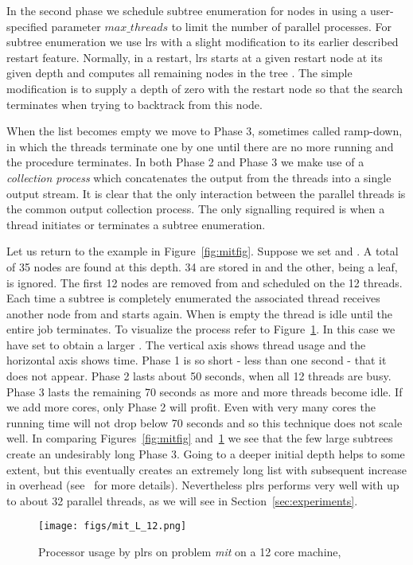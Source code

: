 \documentclass[a4paper,11pt]{article}   \usepackage{authblk} \usepackage[top=1.9cm,bottom=1.9cm,left=1.9cm,right=1.9cm]{geometry}
\newcommand{\progname}{\textsf}
\newcommand{\lrs}{\progname{lrs}\xspace}
\newcommand{\plrs}{\progname{plrs}\xspace}
\newcommand{\polytope}{\emph}
\newcommand{\mitine}{\polytope{mit}\xspace}
\newcommand{\maxthreads}{\ensuremath{\mathit{max\_threads}}\xspace}
\begin{document}
In the second phase we schedule subtree enumeration for nodes in 
using a user-specified parameter \maxthreads to limit the number of parallel processes. 
For subtree enumeration we use \lrs with a slight
modification to its earlier described restart feature.
Normally, in a restart, \lrs starts at a given restart node at its given 
depth and computes all remaining nodes in the tree .
The simple modification is to supply a depth of zero with the restart node so that the search
terminates when trying to backtrack from this node. 

When the list  becomes empty we move to Phase 3, sometimes called ramp-down,
in which the threads
terminate one by one until there are no more running and the procedure terminates.
In both Phase 2 and Phase 3 we make use of a \emph{collection process} which concatenates the output from the threads
into a single output stream.
It is clear that the only interaction between the parallel threads is the common output
collection process. The only signalling required is when a thread initiates or terminates
a subtree enumeration. 

Let us return to the example in Figure~\ref{fig:mitfig}.
Suppose we set  and . 
A total of 35 nodes are found at this depth. 34 are stored in  and the other, being a leaf, is ignored.
The first 12 nodes are removed from  and scheduled on the 12 threads.
Each time a subtree is completely enumerated the associated thread receives
another node from  and starts again. When  is empty the thread is idle
until the entire job terminates.
To visualize the process refer to Figure~\ref{fig:mit_L_12}.
In this case we have set  to obtain a larger .
The vertical axis shows thread usage and the horizontal axis shows time.
Phase 1 is so short - less than one second - that it does not appear.
Phase 2 lasts about 50 seconds, when all 12 threads are busy.
Phase 3 lasts the remaining 70 seconds as more and more threads become idle.
If we add more cores, only Phase 2 will profit. Even with very many
cores the running time will not drop below 70 seconds and so this technique does not
scale well.
In comparing  Figures~\ref{fig:mitfig} and~\ref{fig:mit_L_12} we see that
the few large subtrees create an undesirably long Phase 3.
Going to a deeper initial depth helps to some extent, but this eventually 
creates an extremely long list  with subsequent increase in overhead
(see~\cite{AR13} for more details). 
Nevertheless \plrs performs very well with up to about 32 parallel threads,
as we will see in Section~\ref{sec:experiments}.
\begin{figure}[htbp]
\centering
\texttt{[image: figs/mit\_L\_12.png]}
\caption{Processor usage by \plrs on problem \mitine on a 12 core machine, }                          
\label{fig:mit_L_12}
\end{figure}     
\end{document}
